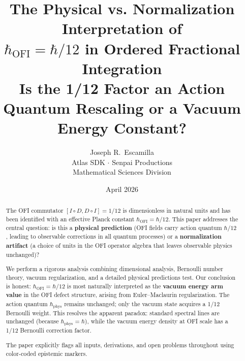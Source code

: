 \documentclass[12pt]{article}
\theoremstyle{definition}
\begin{document}

\title{%
  \textbf{The Physical vs. Normalization Interpretation of}\\[0.3em]
  \textbf{$\hbar_{\mathrm{OFI}} = \hbar/12$ in Ordered Fractional Integration}\\[0.5em]
  \large Is the 1/12 Factor an Action Quantum Rescaling or a Vacuum Energy Constant?%
}

\author{%
  Joseph R.\ Escamilla\\[0.3em]
  \small Atlas SDK $\cdot$ Senpai Productions\\
  \small Mathematical Sciences Division
}

\date{April 2026}

\maketitle

\begin{abstract}
The OFI commutator $[I\circ D, D\circ I] = 1/12$ is dimensionless in natural units
and has been identified with an effective Planck constant $\hbar_{\mathrm{OFI}} = \hbar/12$.
This paper addresses the central question: is this a \textbf{physical prediction} (OFI fields
carry action quantum $\hbar/12$, leading to observable corrections in all quantum
processes) or a \textbf{normalization artifact} (a choice of units in the OFI operator
algebra that leaves observable physics unchanged)?

We perform a rigorous analysis combining dimensional analysis, Bernoulli number theory,
vacuum regularization, and a detailed physical predictions test. Our conclusion is honest:
$\hbar_{\mathrm{OFI}} = \hbar/12$ is most naturally interpreted as the \textbf{vacuum energy arm value}
in the OFI defect structure, arising from Euler--Maclaurin regularization. The action quantum
$\hbar_{\mathrm{phys}}$ remains unchanged; only the vacuum state acquires a 1/12 Bernoulli weight.
This resolves the apparent paradox: standard spectral lines are unchanged (because $\hbar_{\mathrm{phys}} = \hbar$),
while the vacuum energy density at OFI scale has a 1/12 Bernoulli correction factor.

The paper explicitly flags all inputs, derivations, and open problems throughout using
color-coded epistemic markers.
\end{abstract}

\tableofcontents
\newpage

\end{document}

